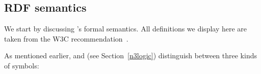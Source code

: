 \subsection{RDF semantics}\label{rdfsemantics}
We start by discussing \rdf's formal semantics. 
All definitions we display here are taken from the W3C recommendation~\cite{RDFSemantics}.



As mentioned earlier, \rdf and \nthree (see Section~\ref{n3logic}) distinguish between three kinds of symbols:

